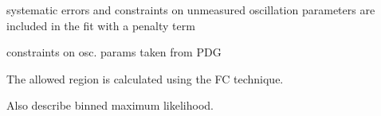 systematic errors and constraints on unmeasured oscillation parameters
are included in the fit with a penalty term

constraints on osc. params taken from PDG

The allowed region is calculated using the FC technique.

Also describe binned maximum likelihood.




